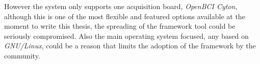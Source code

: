 However the system only supports one acquisition board, \textit{OpenBCI Cyton}, although this is one of the most flexible and featured options available at the moment to write this thesis, the spreading of the framework tool could be seriously compromised. Also the main operating system focused, any based on \textit{GNU/Linux}, could be a reason that limits the adoption of the framework by the community.

